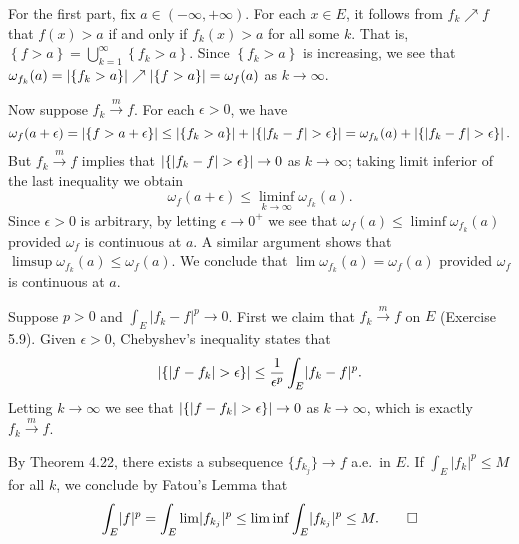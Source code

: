 \begin{exercise}{4.18}
  For the first part, fix $a \in (-\infty, +\infty)$.
  For each $x \in E$,
  it follows from $f_k \nearrow f$ that
  $f(x) > a$ if and only if $f_k(x) > a$ for all some $k$.
  That is, $\left\{ f > a \right\} = \bigcup_{k=1}^{\infty} \left\{ f_k > a \right\}$.
  Since $\left\{ f_k > a \right\}$ is increasing,
  we see that $\omega_{f_k}(a) = \left\vert\left\{ f_k > a \right\}\right\vert \nearrow
  \left\vert\left\{ f > a \right\}\right\vert = \omega_f(a)$ as $k \rightarrow \infty$.

  Now suppose $f_k \xrightarrow{m} f$.
  For each $\epsilon > 0$, we have
  \[
    \omega_f(a + \epsilon) = \left\vert\left\{ f > a + \epsilon \right\}\right\vert \le
    \left\vert\left\{ f_k > a \right\}\right\vert + \left\vert\left\{ \lvert f_k - f \rvert > \epsilon \right\}\right\vert
    = \omega_{f_k}(a) + \left\vert\left\{ \lvert f_k - f \rvert > \epsilon \right\}\right\vert.
  \]
  But $f_k \xrightarrow{m} f$ implies that
  $\left\vert\left\{ \lvert f_k - f \rvert > \epsilon \right\}\right\vert \rightarrow 0$
  as $k \rightarrow \infty$;
  taking limit inferior of the last inequality we obtain
  \[
    \omega_f(a + \epsilon) \le \liminf_{k \rightarrow \infty} \omega_{f_k}(a).
  \]
  Since $\epsilon > 0$ is arbitrary,
  by letting $\epsilon \rightarrow 0^+$ we see that
  $\omega_f(a) \le \liminf \omega_{f_k}(a)$
  provided $\omega_f$ is continuous at $a$.
  A similar argument shows that $\limsup \omega_{f_k}(a) \le \omega_f(a)$.
  We conclude that $\lim \omega_{f_k}(a) = \omega_f(a)$
  provided $\omega_f$ is continuous at $a$.
\end{exercise}

\begin{exercise}{5.10}
  Suppose $p > 0$ and $\int_E \lvert f_k - f \rvert^p \rightarrow 0$.
  First we claim that $f_k \xrightarrow{m} f$ on $E$ (Exercise 5.9).
  Given $\epsilon > 0$, Chebyshev's inequality states that
  \[
    \left\vert\left\{ \lvert f - f_k \rvert > \epsilon \right\}\right\vert
    \le \frac{1}{\epsilon^p} \int_E \lvert f_k - f \rvert^p.
  \]
  Letting $k \rightarrow \infty$
  we see that $\left\vert\left\{ \lvert f - f_k \rvert > \epsilon \right\}\right\vert \rightarrow 0$
  as $k \rightarrow \infty$,
  which is exactly $f_k \xrightarrow{m} f$.

  By Theorem 4.22, there exists a subsequence $\{f_{k_j}\} \rightarrow f$ a.e.\ in $E$.
  If $\int_E \lvert f_k \rvert^p \le M$ for all $k$,
  we conclude by Fatou's Lemma that
  \[
    \int_E \lvert f \rvert^p = \int_E \lim \lvert f_{k_j} \rvert^p
    \le \liminf \int_E \lvert f_{k_j} \rvert^p \le M.
    \qedhere
  \]
\end{exercise}

